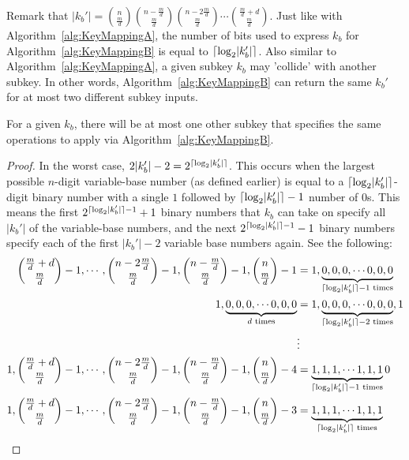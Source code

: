 Remark that $\lvert k_b' \rvert = {n \choose \frac{m}{d}}{n - \frac{m}{d} \choose \frac{m}{d}}{n - 2\frac{m}{d} \choose \frac{m}{d}}\cdots{\frac{m}{d} + d \choose \frac{m}{d}}$. Just like with Algorithm~\ref{alg:KeyMappingA}, the number of bits used to express $k_b$ for Algorithm~\ref{alg:KeyMappingB} is equal to $\lceil\log_2 \lvert k_b' \rvert\rceil$. Also similar to Algorithm~\ref{alg:KeyMappingA}, a given subkey $k_b$ may 'collide' with another subkey. In other words, Algorithm~\ref{alg:KeyMappingB} can return the same $k_b'$ for at most two different subkey inputs.
\begin{theorem}
\label{theorem:collisionForMappingB}
For a given $k_b$, there will be at most one other subkey that specifies the same operations to apply via Algorithm~\ref{alg:KeyMappingB}.
\end{theorem}
\begin{proof}
In the worst case, $2\lvert k_b' \rvert - 2 = 2^{\lceil\log_2 \lvert k_b' \rvert\rceil}$. This occurs when the largest possible $n$-digit variable-base number (as defined earlier) is equal to a $\lceil\log_2 \lvert k_b' \rvert\rceil$-digit binary number with a single $1$ followed by $\lceil\log_2 \lvert k_b' \rvert\rceil - 1$ number of $0$s. This means the first $2^{\lceil\log_2 \lvert k_b' \rvert\rceil - 1} + 1$ binary numbers that $k_b$ can take on specify all $\lvert k_b' \rvert$ of the variable-base numbers, and the next $2^{\lceil\log_2 \lvert k_b' \rvert\rceil - 1} - 1$ binary numbers specify each of the first $\lvert k_b' \rvert - 2$ variable base numbers again. See the following:
\begin{align}
{\frac{m}{d} + d \choose \frac{m}{d}} - 1, \cdots ,{n - 2\frac{m}{d} \choose \frac{m}{d}} - 1, {n - \frac{m}{d} \choose \frac{m}{d}} - 1, {n \choose \frac{m}{d}} - 1 &= 1, \underbrace{0, 0, 0, \cdots 0,0,0}_{\lceil\log_2 \lvert k_b' \rvert\rceil - 1 \text{ times}}\\
1,\underbrace{0, 0, 0, \cdots 0,0,0}_{d \text{ times}} &= 1, \underbrace{0, 0, 0, \cdots 0,0,0}_{\lceil\log_2 \lvert k_b' \rvert\rceil - 2 \text{ times}}, 1\\
& \vdots \nonumber \\
1,{\frac{m}{d} + d \choose \frac{m}{d}} - 1, \cdots ,{n - 2\frac{m}{d} \choose \frac{m}{d}} - 1, {n - \frac{m}{d} \choose \frac{m}{d}} - 1, {n \choose \frac{m}{d}} - 4 &= \underbrace{1, 1, 1, \cdots 1,1,1}_{\lceil\log_2 \lvert k_b' \rvert\rceil -1\text{ times}} 0 \\
1,{\frac{m}{d} + d \choose \frac{m}{d}} - 1, \cdots ,{n - 2\frac{m}{d} \choose \frac{m}{d}} - 1, {n - \frac{m}{d} \choose \frac{m}{d}} - 1, {n \choose \frac{m}{d}} - 3 &= \underbrace{1, 1, 1, \cdots 1,1,1}_{\lceil\log_2 \lvert k_b' \rvert\rceil\text{ times}}
\end{align}
\end{proof}


